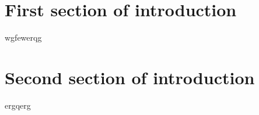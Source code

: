 \section{First section of introduction}

wgfewerqg

\section{Second section of introduction}

ergqerg